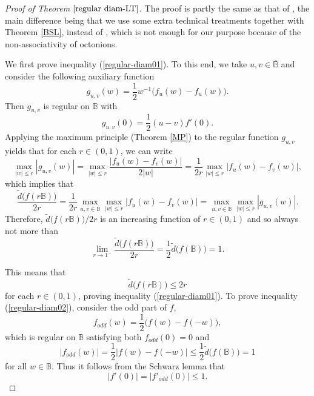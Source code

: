 \documentclass{amsart}
\theoremstyle{definition}
\theoremstyle{remark}
\numberwithin{equation}{section}
\begin{document}
\begin{proof}[Proof of Theorem $\ref{regular diam-LT}$]
The proof is partly the same as that of \cite[Theorem 3.9]{Gen-Sar}, the main difference being that we use some extra technical treatments together with Theorem \ref{BSL}, instead of \cite[Proposition 3.2]{Gen-Sar}, which is not enough for our purpose because of the non-associativity of octonions.

We first prove inequality (\ref{regular-diam01}). To this end, we take $u, v\in\overline{\mathbb B}$ and consider the following auxiliary function
$$g_{u,v}(w)=\frac12 w^{-1}\big(f_u(w)-f_u(w)\big).$$
Then $g_{u,v}$ is regular on $\mathbb B$ with
\begin{equation}\label{g-value}
g_{u,v}(0)=\frac12 (u-v)f'(0).
\end{equation}
Applying the maximum principle (Theorem \ref{MP}) to the  regular function $g_{u,v}$
 yields that for each $r\in(0,1)$, we can write
$$\max_{|w|\leq r}|g_{u,v}(w)|=\max_{|w|\leq r}\frac{|f_u(w)-f_v(w)|}{2|w|}
=\frac1{2r}\max_{|w|\leq r} |f_u(w)-f_v(w)|,$$
which implies that
\begin{equation}\label{diameter-quo01}
\frac{\widetilde{d}\big(f(r\mathbb B)\big)}{2r}
=\frac1{2r}\max_{u,v\in \overline{\mathbb B}}\max_{|w|\leq r}|f_u(w)-f_v(w)|
=\max_{u,v\in \overline{\mathbb B}}\max_{|w|\leq r}|g_{u,v}(w)|.
\end{equation}
Therefore, $\widetilde{d}\big(f(r\mathbb B)\big)/2r$ is an increasing function of $r\in(0,1)$ and so always not more than
$$\lim_{r\rightarrow1^-}\frac{\widetilde{d}\big(f(r\mathbb B)\big)}{2r}
=\frac12 \widetilde{d}\big(f(\mathbb B)\big)=1.$$

This means that
\begin{equation}\label{regular-diam10}
\widetilde{d}\big(f(r\mathbb B)\big)\leq 2r
\end{equation}
for each $r\in(0, 1)$, proving inequality (\ref{regular-diam01}). To prove inequality (\ref{regular-diam02}), consider the odd part of $f$,
$$f_{odd}(w)=\frac12\big(f(w)-f(-w)\big),$$
which is regular on $\mathbb B$ satisfying both $f_{odd}(0)=0$ and
$$|f_{odd}(w)|=\frac12|f(w)-f(-w)|\leq\frac12 \widetilde{d}\big(f(\mathbb B)\big)=1$$
for all $w\in\mathbb B$. Thus it follows from the Schwarz  lemma that
\begin{equation}\label{modulus of der}
|f'(0)|=|f'_{odd}(0)|\leq 1.
\end{equation}


\end{proof}
\end{document}
